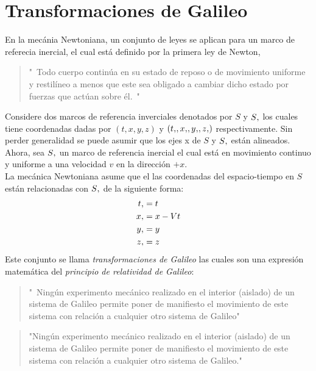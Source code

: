 \documentclass[../main.tex]{subfiles}
\begin{document}
\section{Transformaciones de Galileo}
En la mecánia Newtoniana, un conjunto de leyes se aplican para un marco de referecia inercial, el cual está definido por la primera ley de Newton, 
\begin{quote}
    "\ Todo cuerpo continúa en su estado de reposo o de movimiento uniforme y restilíneo a menos que este sea obligado a cambiar dicho estado por fuerzas que actúan sobre él.\ "
\end{quote}
Considere dos marcos de referencia inverciales denotados por $S$ y $S\vtick$ los cuales tiene coordenadas dadas por $(t,x,y,z)$ y $(t\vtick,x\vtick,y\vtick,z\vtick)$ respectivamente. Sin perder generalidad se puede asumir que los ejes x de $S$ y $S\vtick$ están alineados. Ahora, sea $S\vtick$ un marco de referencia inercial el cual está en movimiento continuo y uniforme a una velocidad $v$ en la dirección $+x$. \\
La mecánica Newtoniana asume que el las coordenadas del espacio-tiempo en $S$ están relacionadas con $S\vtick$ de la siguiente forma:
\begin{equation} \label{transf-galileo}
    \begin{aligned}
        t\vtick&=t \\
        x\vtick&=x-Vt \\
        y\vtick&=y \\
        z\vtick&=z
    \end{aligned}
\end{equation}
Este conjunto se llama \emph{transformaciones de Galileo} las cuales son una expresión matemática del \emph{principio de relatividad de Galileo}:
\begin{quote}
    "\ Ningún experimento mecánico realizado en el interior (aislado) de un sistema de Galileo permite poner de manifiesto el movimiento de este sistema con relación a cualquier otro sistema de Galileo"
\end{quote}
\begin{quote} "Ningún experimento mecánico realizado en el interior (aislado) de un sistema de Galileo permite poner de manifiesto el movimiento de este sistema con relación a cualquier otro sistema de Galileo." \end{quote}
\end{document}
